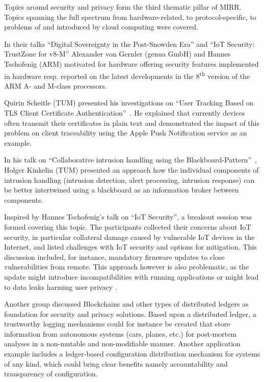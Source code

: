 Topics around security and privacy form the third thematic pillar of MIRR.
Topics spanning the full spectrum from hardware-related, to protocol-specific,
to problems of and introduced by cloud computing were covered.


In their talks ``Digital Sovereignty in the Post-Snowden Era'' and ``IoT
Security: TrustZone for v8-M'' Alexander von Gernler (genua GmbH) and Hannes
Tschofenig (ARM) motivated for hardware offering security features implemented
in hardware resp. reported on the latest developments in the
8\textsuperscript{th} version of the ARM A- and M-class processors.

Quirin Scheitle (TUM) presented his investigations on ``User Tracking Based on
TLS Client Certificate Authentication''~\cite{qscheitle:tma:2017}. He explained
that currently devices often transmit their certificates in plain text and
demonstrated the impact of this problem on client traceability using the Apple
Push Notification service as an example.

In his talk on ``Collaborative intrusion handling using the
Blackboard-Pattern''~\cite{herold:iscs:2016}, Holger Kinkelin (TUM) presented an
approach how the individual components of intrusion handling (intrusion
detection, alert processing, intrusion response) can be better intertwined using
a blackboard as an information broker between components.


Inspired by Hannes Tschofenig's talk on ``IoT Security'', a breakout session was
formed covering this topic. The participants collected their concerns about IoT
security, in particular collateral damage caused by vulnerable IoT devices in
the Internet, and listed challenges with IoT security and options for
mitigation. This discussion included, for instance, mandatory firmware updates
to close vulnerabilities from remote. This approach however is also problematic,
as the update might introduce incompatibilities with running applications or
might lead to data leaks harming user privacy \cite{Haus:CST2017}.

Another group discussed Blockchains and other types of distributed ledgers as
foundation for security and privacy solutions. Based upon a distributed ledger,
a trustworthy logging mechanisms could for instance be created that store
information from autonomous systems (cars, planes, etc.) for post-mortem
analyses in a non-mutable and non-modifiable manner. Another application example
includes a ledger-based configuration distribution mechanism for systems of any
kind, which could bring clear benefits namely accountability and transparency of
configuration.

